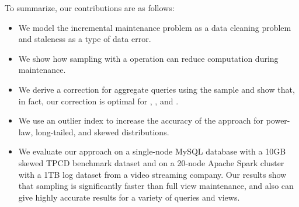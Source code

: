 





To summarize, our contributions are as follows:
\begin{itemize}\vspace{-.45em}
\item We model the incremental maintenance problem as a data cleaning problem and staleness as a type of data error.\vspace{-.45em}
\item We show how sampling with a \hashop operation can reduce computation during maintenance. \vspace{-.45em}
\item We derive a correction for aggregate queries using the sample and show that, in fact, our correction is optimal for \sumfunc, \countfunc, and \avgfunc. \vspace{-.45em}
\item We use an outlier index to increase the accuracy of the approach for power-law, long-tailed, and skewed distributions.\vspace{-.45em}
\item We evaluate our approach on a single-node MySQL database with a 10GB skewed TPCD benchmark dataset and on a 20-node Apache Spark cluster with a 1TB log dataset from a video streaming company. Our results show that sampling is significantly faster than full view maintenance, and also can give highly accurate results for a variety of queries and views.\vspace{-.45em}
\end{itemize}

